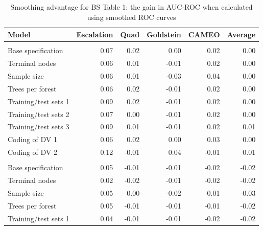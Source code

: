\documentclass[]{article}
\begin{document}
\begin{table}[t]

\caption{\label{tab:table1-benefit}Smoothing advantage for BS Table 1: the gain in AUC-ROC when calculated using smoothed ROC curves}
\centering
\begin{tabular}{lrrrrr}
\toprule
Model & Escalation & Quad & Goldstein & CAMEO & Average\\
\midrule
\addlinespace[0.3em]
\multicolumn{6}{l}{\textbf{One-month forecasts}}\\
\hspace{1em}Base specification & 0.07 & 0.02 & 0.00 & 0.02 & 0.00\\
\hspace{1em}Terminal nodes & 0.06 & 0.01 & -0.01 & 0.02 & 0.00\\
\hspace{1em}Sample size & 0.06 & 0.01 & -0.03 & 0.04 & 0.00\\
\hspace{1em}Trees per forest & 0.06 & 0.02 & -0.01 & 0.02 & 0.00\\
\hspace{1em}Training/test sets 1 & 0.09 & 0.02 & -0.01 & 0.02 & 0.00\\
\hspace{1em}Training/test sets 2 & 0.07 & 0.00 & -0.01 & 0.02 & 0.00\\
\hspace{1em}Training/test sets 3 & 0.09 & 0.01 & -0.01 & 0.02 & 0.01\\
\hspace{1em}Coding of DV 1 & 0.06 & 0.02 & 0.00 & 0.03 & 0.00\\
\hspace{1em}Coding of DV 2 & 0.12 & -0.01 & 0.04 & -0.01 & 0.01\\
\addlinespace[0.3em]
\multicolumn{6}{l}{\textbf{Six-month forecasts}}\\
\hspace{1em}Base specification & 0.05 & -0.01 & -0.01 & -0.02 & -0.02\\
\hspace{1em}Terminal nodes & 0.02 & -0.02 & -0.01 & -0.02 & -0.02\\
\hspace{1em}Sample size & 0.05 & 0.00 & -0.02 & -0.01 & -0.03\\
\hspace{1em}Trees per forest & 0.05 & -0.01 & -0.01 & -0.01 & -0.02\\
\hspace{1em}Training/test sets 1 & 0.04 & -0.01 & -0.01 & -0.02 & -0.02\\

\end{tabular}
\end{table}
\end{document}
